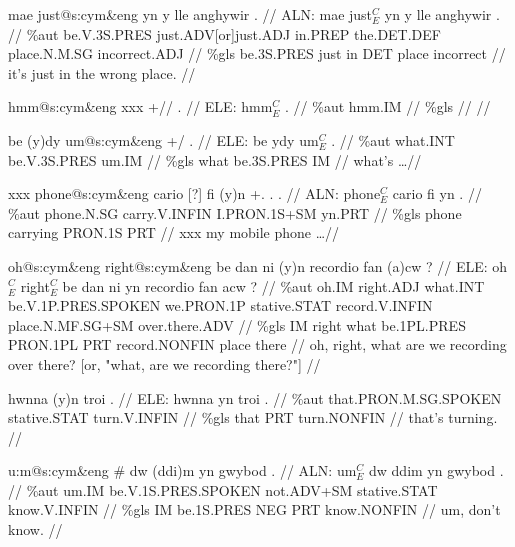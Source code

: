 \documentclass[a4paper,10pt]{article}
\begin{document}
\ex
\begingl[lingstyle=gergl]
\glchat mae just@s:cym\&eng yn y lle anghywir . //
\glsurface ALN:  mae just$^{C}_{E}$ yn y lle anghywir .  //
\glauto \%aut  be{\scriptsize .V.3S.PRES} just{\scriptsize .ADV[or]just.ADJ} in{\scriptsize .PREP} the{\scriptsize .DET.DEF} place{\scriptsize .N.M.SG} incorrect{\scriptsize .ADJ}   //
\glmanual \%gls  be{\scriptsize .3S.PRES} just in DET place incorrect   //
\gleng it's just in the wrong place. //
\endgl
\xe

\ex
\begingl[lingstyle=gergl]
\glchat hmm@s:cym\&eng xxx +// . //
\glsurface ELE:  hmm$^{C}_{E}$ .  //
\glauto \%aut  hmm{\scriptsize .IM}   //
\glmanual \%gls     //
\gleng  //
\endgl
\xe

\ex
\begingl[lingstyle=gergl]
\glchat be (y)dy um@s:cym\&eng +/ . //
\glsurface ELE:  be ydy um$^{C}_{E}$ .  //
\glauto \%aut  what{\scriptsize .INT} be{\scriptsize .V.3S.PRES} um{\scriptsize .IM}   //
\glmanual \%gls  what be{\scriptsize .3S.PRES} IM   //
\gleng what's \dots  //
\endgl
\xe

\ex
\begingl[lingstyle=gergl]
\glchat xxx phone@s:cym\&eng cario [?] fi (y)n +. . . //
\glsurface ALN:  phone$^{C}_{E}$ cario fi yn .  //
\glauto \%aut  phone{\scriptsize .N.SG} carry{\scriptsize .V.INFIN} I{\scriptsize .PRON.1S+SM} yn{\scriptsize .PRT}   //
\glmanual \%gls  phone carrying PRON{\scriptsize .1S} PRT   //
\gleng xxx my mobile phone \dots  //
\endgl
\xe

\ex
\begingl[lingstyle=gergl]
\glchat oh@s:cym\&eng right@s:cym\&eng be dan ni (y)n recordio fan (a)cw ? //
\glsurface ELE:  oh$^{C}_{E}$ right$^{C}_{E}$ be dan ni yn recordio fan acw ?  //
\glauto \%aut  oh{\scriptsize .IM} right{\scriptsize .ADJ} what{\scriptsize .INT} be{\scriptsize .V.1P.PRES.SPOKEN} we{\scriptsize .PRON.1P} stative{\scriptsize .STAT} record{\scriptsize .V.INFIN} place{\scriptsize .N.MF.SG+SM} over{\scriptsize .there.ADV}   //
\glmanual \%gls  IM right what be{\scriptsize .1PL.PRES} PRON{\scriptsize .1PL} PRT record{\scriptsize .NONFIN} place there   //
\gleng oh, right, what are we recording over there? [or, "what, are we recording there?"] //
\endgl
\xe

\ex
\begingl[lingstyle=gergl]
\glchat hwnna (y)n troi . //
\glsurface ELE:  hwnna yn troi .  //
\glauto \%aut  that{\scriptsize .PRON.M.SG.SPOKEN} stative{\scriptsize .STAT} turn{\scriptsize .V.INFIN}   //
\glmanual \%gls  that PRT turn{\scriptsize .NONFIN}   //
\gleng that's turning. //
\endgl
\xe

\ex
\begingl[lingstyle=gergl]
\glchat u:m@s:cym\&eng \# dw (ddi)m yn gwybod . //
\glsurface ALN:  um$^{C}_{E}$ dw ddim yn gwybod .  //
\glauto \%aut  um{\scriptsize .IM} be{\scriptsize .V.1S.PRES.SPOKEN} not{\scriptsize .ADV+SM} stative{\scriptsize .STAT} know{\scriptsize .V.INFIN}   //
\glmanual \%gls  IM be{\scriptsize .1S.PRES} NEG PRT know{\scriptsize .NONFIN}   //
\gleng um, don't know. //
\endgl
\xe
\end{document}
